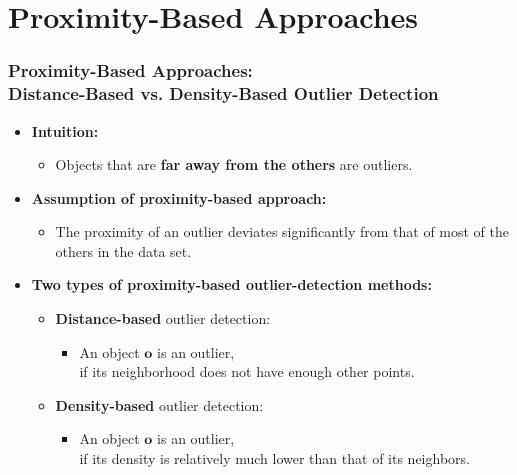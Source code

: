 \section{Proximity-Based Approaches}


\begin{frame}
  \frametitle{Proximity-Based Approaches: \\
    Distance-Based vs. Density-Based Outlier Detection}
  \begin{itemize}
  \item \textbf{Intuition:}
    \begin{itemize}
    \item Objects that are \textbf{far away from the others} are outliers.
    \end{itemize}
  \item \textbf{Assumption of proximity-based approach:}
    \begin{itemize}
    \item The proximity of an outlier deviates significantly from that of most of the others in the data set.
    \end{itemize}
  \item \textbf{Two types of proximity-based outlier-detection methods:}
    \begin{itemize}
    \item \textbf{\color{airforceblue}Distance-based} outlier detection:
      \begin{itemize}
      \item An object $\mathbf{o}$ is an outlier, \\
        if its neighborhood does not have enough other points.
      \end{itemize}
    \item \textbf{\color{airforceblue}Density-based} outlier detection:
      \begin{itemize}
      \item An object $\mathbf{o}$ is an outlier, \\
        if its density is relatively much lower than that of its neighbors.
      \end{itemize}
    \end{itemize}
  \end{itemize}
\end{frame}


